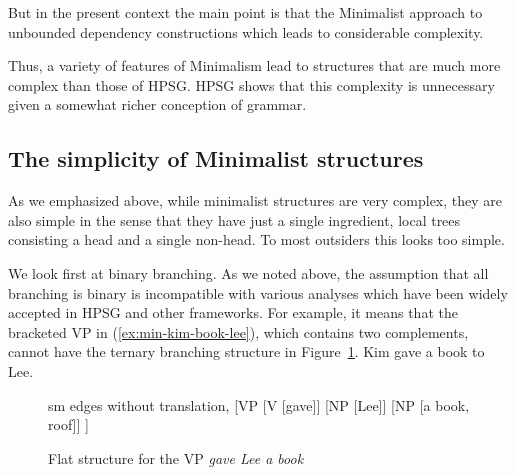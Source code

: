 \documentclass[output=paper]{langsci/langscibook}
\begin{document}
But in the present context the main point is that the Minimalist approach to unbounded dependency
constructions which leads to considerable complexity.


Thus, a variety of features of Minimalism lead to structures that are much more complex than those of HPSG. HPSG shows that this complexity is unnecessary given a somewhat richer conception of grammar. 
\subsection{The simplicity of Minimalist structures}
\label{subsec:min-simplicity}

As we emphasized above, while minimalist structures are very complex, they are also simple in the sense that they have just a single ingredient, local trees consisting a head and a single non-head. To most outsiders this looks too simple.

We look first at binary branching. As we noted above, the assumption that all branching is binary is incompatible with various analyses which have been widely accepted in HPSG and other frameworks. For example, it means that the bracketed VP in (\ref{ex:min-kim-book-lee}), which contains two complements, cannot have the ternary branching structure in Figure~\ref{fig:gave-lee-book}.
\ea
Kim gave a book to Lee.\label{ex:min-kim-book-lee}
\z
\begin{figure}
	\centering
	\begin{forest} sm edges without translation, 
		[VP
		[V [gave]] [NP [Lee]] [NP [a book, roof]]
		]
	\end{forest}
	\caption{\label{fig:gave-lee-book}Flat structure for the VP \emph{gave Lee a book}}
\end{figure}
\end{document}
